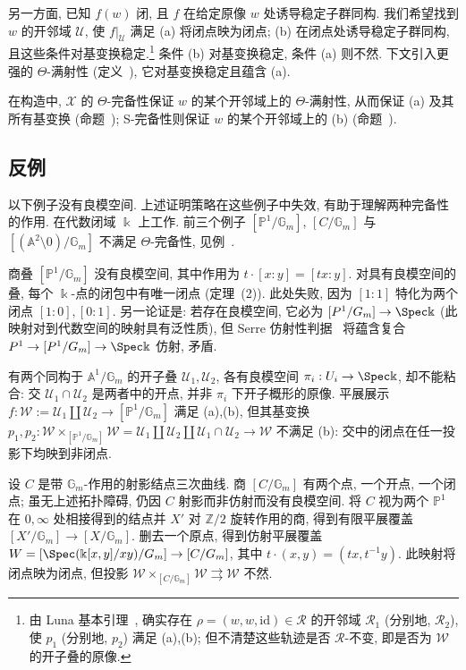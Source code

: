 另一方面, 已知 $f(w)$ 闭, 且 $f$ 在给定原像 $w$ 处诱导稳定子群同构. 我们希望找到 $w$ 的开邻域 $\mathcal U$, 使 $f|_{\mathcal U}$ 满足 (a) 将闭点映为闭点; (b) 在闭点处诱导稳定子群同构, 且这些条件对基变换稳定.\footnote{由 Luna 基本引理~, 确实存在 $\rho=(w,w,\mathrm{id})\in\mathcal R$ 的开邻域 $\mathcal R_1$ (分别地, $\mathcal R_2$), 使 $p_1$ (分别地, $p_2$) 满足 (a),(b); 但不清楚这些轨迹是否 $\mathcal R$-不变, 即是否为 $\mathcal W$ 的开子叠的原像.} 条件 (b) 对基变换稳定, 条件 (a) 则不然. 下文引入更强的 $\Theta$-满射性 (定义~), 它对基变换稳定且蕴含 (a).

在构造中, $\mathcal X$ 的 $\Theta$-完备性保证 $w$ 的某个开邻域上的 $\Theta$-满射性, 从而保证 (a) 及其所有基变换 (命题~); S-完备性则保证 $w$ 的某个开邻域上的 (b) (命题~).
\subsection{反例}\label{src:7.10.2-subsection}
以下例子没有良模空间. 上述证明策略在这些例子中失效, 有助于理解两种完备性的作用. 在代数闭域 $\Bbbk$ 上工作. 前三个例子 $[\mathbb P^1/\mathbb G_m]$, $[C/\mathbb G_m]$ 与 $[(\mathbb A^2\setminus0)/\mathbb G_m]$ 不满足 $\Theta$-完备性, 见例~.
\begin{example}\label{src:7.10.2}
商叠 $[\mathbb P^1/\mathbb G_m]$ 没有良模空间, 其中作用为 $t\cdot[x:y]=[tx:y]$. 对具有良模空间的叠, 每个 $\Bbbk$-点的闭包中有唯一闭点 (定理~(2)). 此处失败, 因为 $[1:1]$ 特化为两个闭点 $[1:0],[0:1]$. 另一论证是: 若存在良模空间, 它必为 $[\mathbb P^1/\mathbb G_m]\to\Spec\Bbbk$ (此映射对到代数空间的映射具有泛性质), 但 Serre 仿射性判据~ 将蕴含复合 $\mathbb P^1\to[\mathbb P^1/\mathbb G_m]\to\Spec\Bbbk$ 仿射, 矛盾.

有两个同构于 $\mathbb A^1/\mathbb G_m$ 的开子叠 $\mathcal U_1,\mathcal U_2$, 各有良模空间 $\pi_i:\mathcal U_i\to\Spec\Bbbk$, 却不能粘合: 交 $\mathcal U_1\cap\mathcal U_2$ 是两者中的开点, 并非 $\pi_i$ 下开子概形的原像. 平展展示 $f:\mathcal W:=\mathcal U_1\coprod\mathcal U_2\to[\mathbb P^1/\mathbb G_m]$ 满足 (a),(b), 但其基变换 $p_1,p_2:\mathcal W\times_{[\mathbb P^1/\mathbb G_m]}\mathcal W=\mathcal U_1\coprod\mathcal U_2\coprod\mathcal U_1\cap\mathcal U_2\to\mathcal W$ 不满足 (b): 交中的闭点在任一投影下均映到非闭点.
\end{example}
\begin{example}\label{src:7.10.3}
设 $C$ 是带 $\mathbb G_m$-作用的射影结点三次曲线. 商 $[C/\mathbb G_m]$ 有两个点, 一个开点, 一个闭点; 虽无上述拓扑障碍, 仍因 $C$ 射影而非仿射而没有良模空间. 将 $C$ 视为两个 $\mathbb P^1$ 在 $0,\infty$ 处相接得到的结点并 $X'$ 对 $\mathbb Z/2$ 旋转作用的商, 得到有限平展覆盖 $[X'/\mathbb G_m]\to[X/\mathbb G_m]$. 删去一个原点, 得到仿射平展覆盖 $\mathcal W=[\Spec(\Bbbk[x,y]/xy)/\mathbb G_m]\to[C/\mathbb G_m]$, 其中 $t\cdot(x,y)=(tx,t^{-1}y)$. 此映射将闭点映为闭点, 但投影 $\mathcal W\times_{[C/\mathbb G_m]}\mathcal W\rightrightarrows\mathcal W$ 不然.
\end{example}
